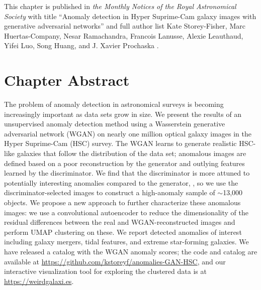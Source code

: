 \graphicspath{{figures/figures_anomalies/}}

This chapter is published in \emph{the Monthly Notices of the Royal Astronomical Society} with title ``Anomaly detection in Hyper Suprime-Cam galaxy images with generative adversarial networks'' and full author list Kate Storey-Fisher, Marc Huertas-Company, Nesar Ramachandra, Francois Lanusse, Alexie Leauthaud, Yifei Luo, Song Huang, and J. Xavier Prochaska \citep{storey-fisher_anomaly_2021}.

\section{Chapter Abstract}
The problem of anomaly detection in astronomical surveys is becoming increasingly important as data sets grow in size.
We present the results of an unsupervised anomaly detection method using a Wasserstein generative adversarial network (WGAN) on nearly one million optical galaxy images in the Hyper Suprime-Cam (HSC) survey.
The WGAN learns to generate realistic HSC-like galaxies that follow the distribution of the data set; anomalous images are defined based on a poor reconstruction by the generator and outlying features learned by the discriminator.
We find that the discriminator is more attuned to potentially interesting anomalies compared to the generator, , so we use the discriminator-selected images to construct a high-anomaly sample of $\sim$13,000 objects.
We propose a new approach to further characterize these anomalous images: we use a convolutional autoencoder to reduce the dimensionality of the residual differences between the real and WGAN-reconstructed images and perform UMAP clustering on these.
We report detected anomalies of interest including galaxy mergers, tidal features, and extreme star-forming galaxies.
We have released a catalog with the WGAN anomaly scores; the code and catalog are available at \url{https://github.com/kstoreyf/anomalies-GAN-HSC}, and our interactive visualization tool for exploring the clustered data is at \url{https://weirdgalaxi.es}.




